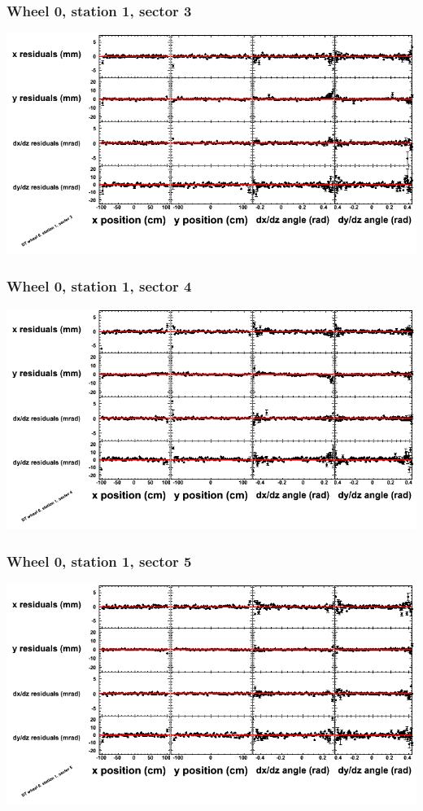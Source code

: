 \documentclass[compress]{beamer}
\begin{document}
\begin{frame}
\frametitle{Wheel 0, station 1, sector 3}
\includegraphics[width=\linewidth]{tmppoly_MBwhCst1sec03.png}
\end{frame}

\begin{frame}
\frametitle{Wheel 0, station 1, sector 4}
\includegraphics[width=\linewidth]{tmppoly_MBwhCst1sec04.png}
\end{frame}

\begin{frame}
\frametitle{Wheel 0, station 1, sector 5}
\includegraphics[width=\linewidth]{tmppoly_MBwhCst1sec05.png}
\end{frame}
\end{document}
